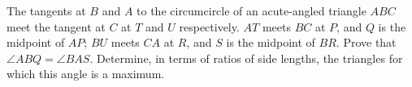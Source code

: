 The tangents at $B$ and $A$ to the circumcircle of an acute-angled triangle $ABC$ meet the tangent at $C$ at $T$ and $U$ respectively. $AT$ meets $BC$ at $P$, and $Q$ is the midpoint of $AP$; $BU$ meets $CA$ at $R$, and $S$ is the midpoint of $BR$. Prove that $\angle ABQ = \angle BAS$. Determine, in terms of ratios of side lengths, the triangles for which this angle is a maximum.
